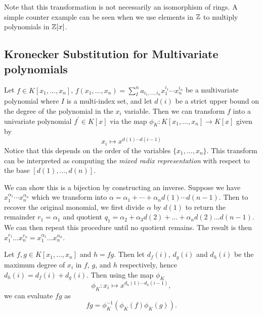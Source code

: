 Note that this transformation is not necessarily an isomorphism of rings. A simple counter example can be seen when we use elements in ${\mathbb Z}$ to multiply polynomials in ${\mathbb Z}[x]$.

\medskip 

\subsection{Kronecker Substitution for Multivariate polynomials}

Let $f \in K[x_1, \ldots, x_n]$, $f(x_1, \ldots, x_n) = \sum^n_{I}a_{i_1, \ldots, i_n}x_1^{i_1}\cdots x_n^{i_n}$ be a multivariate polynomial where $I$ is a multi-index set, and let $d(i)$ be a strict upper bound on the degree of the polynomial in the $x_i$ variable. Then we can transform $f$ into a univariate polynomial $f^\prime \in K[x]$ via the map $\phi_K: K[x_1, \ldots, x_n] \to K[x]$ given by
\[
    x_i \mapsto x^{d(1) \cdots d(i-1)}
\]
Notice that this depends on the order of the variables $\{x_1, \ldots, x_n\}$. This transform can be interpreted as computing the \emph{mixed radix representation} with respect to the base $[d(1), \ldots, d(n)]$.

We can show this is a bijection by constructing an inverse. Suppose we have $x_1^{\alpha_1}\cdots x_n^{\alpha_n}$ which we transform into $\alpha = \alpha_1 + \cdots + \alpha_n d(1) \cdots d(n-1)$. Then to recover the original monomial, we first divide $\alpha$ by $d(1)$ to return the remainder $r_1 = \alpha_1$ and quotient $q_1 = \alpha_2 + \alpha_3 d(2) + \ldots + \alpha_n d(2) \ldots d(n-1)$. We can then repeat this procedure until no quotient remains. The result is then $x_1^{r_1} \ldots x_n^{r_n} = x_1^{\alpha_1} \ldots x_n^{\alpha_n}$.

\begin{proposition}
    Let $f, g \in K[x_1, \ldots, x_n]$ and $h = fg$. Then let $d_f(i)$, $d_g(i)$ and $d_h(i)$ be the maximum degree of $x_i$ in $f$, $g$, and $h$ respectively, hence $d_h(i) = d_f(i) + d_g(i)$. Then using the map $\phi_K$
    \[
        \phi_K: x_i \mapsto x^{d_h(1) \cdots d_h(i-1)},
    \]
    we can evaluate $fg$ as
    \[
        f g= \phi^{-1}_K(\phi_K(f) \phi_K(g)).
    \]
\end{proposition}

